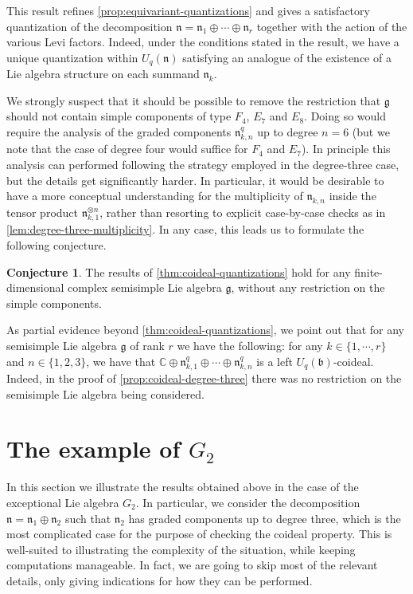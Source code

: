 \documentclass[a4paper, 12pt, reqno, english]{amsart}
\numberwithin{equation}{section}
\numberwithin{figure}{section}
\theoremstyle{plain}
\theoremstyle{plain}
\theoremstyle{plain}
\theoremstyle{plain}
\theoremstyle{plain}
\theoremstyle{definition}
\theoremstyle{definition}
\theoremstyle{definition}
\theoremstyle{remark}
\theoremstyle{definition}
\theoremstyle{definition}
\newtheorem{conjecture}[theorem]{Conjecture}
\newcommand{\Uqb}{U_q(\mathfrak{b})}
\newcommand{\Uqn}{U_q(\mathfrak{n})}
\newcommand{\bbC}{\mathbb{C}}
\newcommand{\lieg}{\mathfrak{g}}
\newcommand{\lien}{\mathfrak{n}}
\newcommand{\qnil}{\lien^q}
\begin{document}
This result refines \cref{prop:equivariant-quantizations} and gives a satisfactory quantization of the decomposition $\lien = \lien_1 \oplus \cdots \oplus \lien_r$ together with the action of the various Levi factors.
Indeed, under the conditions stated in the result, we have a unique quantization within $\Uqn$ satisfying an analogue of the existence of a Lie algebra structure on each summand $\lien_k$.

We strongly suspect that it should be possible to remove the restriction that $\lieg$ should not contain simple components of type $F_4$, $E_7$ and $E_8$.
Doing so would require the analysis of the graded components $\qnil_{k, n}$ up to degree $n = 6$ (but we note that the case of degree four would suffice for $F_4$ and $E_7$).
In principle this analysis can performed following the strategy employed in the degree-three case, but the details get significantly harder.
In particular, it would be desirable to have a more conceptual understanding for the multiplicity of $\lien_{k, n}$ inside the tensor product $\lien_{k, 1}^{\otimes n}$, rather than resorting to explicit case-by-case checks as in \cref{lem:degree-three-multiplicity}.
In any case, this leads us to formulate the following conjecture.

\begin{conjecture}
\label{conj:coideal}
The results of \cref{thm:coideal-quantizations} hold for any finite-dimensional complex semisimple Lie algebra $\lieg$, without any restriction on the simple components.
\end{conjecture}

As partial evidence beyond \cref{thm:coideal-quantizations}, we point out that for any semisimple Lie algebra $\lieg$ of rank $r$ we have the following: for any $k \in \{ 1, \cdots, r \}$ and $n \in \{ 1, 2, 3 \}$, we have that $\bbC \oplus \qnil_{k, 1} \oplus \cdots \oplus \qnil_{k, n}$ is a left $\Uqb$-coideal.
Indeed, in the proof of \cref{prop:coideal-degree-three} there was no restriction on the semisimple Lie algebra being considered.

\section{The example of $G_2$}
\label{sec:example-G2}

In this section we illustrate the results obtained above in the case of the exceptional Lie algebra $G_2$.
In particular, we consider the decomposition $\lien = \lien_1 \oplus \lien_2$ such that $\lien_2$ has graded components up to degree three, which is the most complicated case for the purpose of checking the coideal property.
This is well-suited to illustrating the complexity of the situation, while keeping computations manageable.
In fact, we are going to skip most of the relevant details, only giving indications for how they can be performed.
\end{document}
